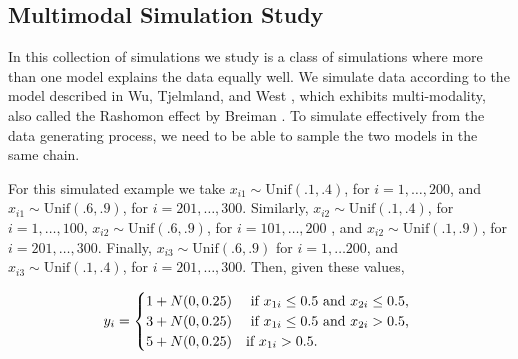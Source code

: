 %

\subsection{Multimodal Simulation Study}
In this collection of simulations we study is a class of simulations where more than one model explains the data equally well. We simulate data according to the model described in Wu, Tjelmland, and West \cite{wu2007bayesian}, which exhibits multi-modality, also called the Rashomon effect by Breiman \cite{breiman2001statistical}. To simulate effectively from the data generating process, we need to be able to sample the two models in the same chain. 

For this simulated example we take $x_{i1} \sim \text{Unif}(.1,.4)$, for $i=1,\dots ,200$, and $x_{i1} \sim \text{Unif}(.6,.9)$, for $i=201,\dots,300$. Similarly, $x_{i2} \sim \text{Unif}(.1,.4)$, for $i=1,\dots ,100$, $x_{i2} \sim \text{Unif}(.6,.9)$, for $i=101, \dots,200$ , and $x_{i2} \sim \text{Unif}(.1,.9)$, for $i=201, \dots,300$. Finally, $x_{i3} \sim \text{Unif}(.6,.9)$ for $i =1, \dots 200$, and $x_{i3} \sim \text{Unif}(.1,.4)$, for $i=201, \dots,300$. Then, given these values, 

\[
 y_i =
  \begin{cases} 
      \hfill 1+N(0,0.25)    \hfill & \text{ if $x_{1i} \leq 0.5$ and $x_{2i} \leq 0.5$, } \\
      \hfill 3+ N(0,0.25) \hfill & \text{ if $x_{1i} \leq 0.5$ and $x_{2i} > 0.5$, } \\
      \hfill 5+ N(0,0.25) \hfill & \text{if $x_{1i} > 0.5$. }\\
  \end{cases}
\]

